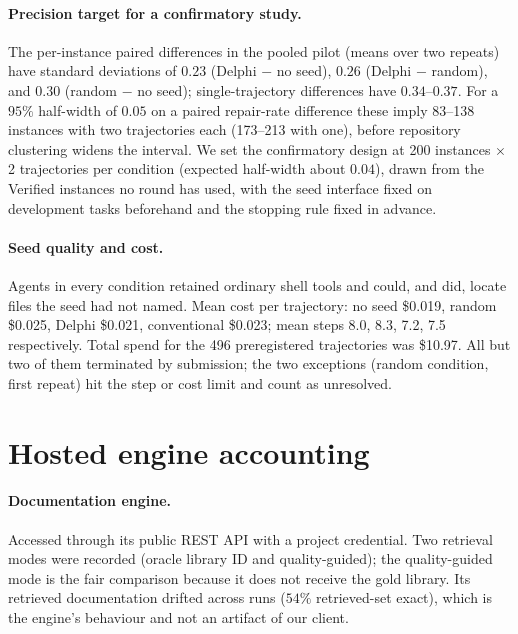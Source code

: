 \documentclass{article}
\newcommand{\system}{Delphi}
\begin{document}
\begin{table}[h]
\caption{Seed-interface check on the 62 pilot instances, one trajectory per instance (the no-seed and paths+heads rows are the first pilot repeat). Exploratory; not preregistered.}
\label{tab:seedinterface}
\centering
\footnotesize
\setlength{\tabcolsep}{4pt}
\resizebox{\textwidth}{!}{}
\end{table}

\paragraph{Precision target for a confirmatory study.} The per-instance paired differences in the pooled pilot (means over two repeats) have standard deviations of $0.23$ (\system{} $-$ no seed), $0.26$ (\system{} $-$ random), and $0.30$ (random $-$ no seed); single-trajectory differences have $0.34$--$0.37$. For a $95\%$ half-width of $0.05$ on a paired repair-rate difference these imply 83--138 instances with two trajectories each (173--213 with one), before repository clustering widens the interval. We set the confirmatory design at 200 instances $\times$ 2 trajectories per condition (expected half-width about $0.04$), drawn from the Verified instances no round has used, with the seed interface fixed on development tasks beforehand and the stopping rule fixed in advance.

\paragraph{Seed quality and cost.} Agents in every condition retained ordinary shell tools and could, and did, locate files the seed had not named. Mean cost per trajectory: no seed \$0.019, random \$0.025, \system{} \$0.021, conventional \$0.023; mean steps 8.0, 8.3, 7.2, 7.5 respectively. Total spend for the 496 preregistered trajectories was \$10.97. All but two of them terminated by submission; the two exceptions (random condition, first repeat) hit the step or cost limit and count as unresolved.

\section{Hosted engine accounting}
\label{app:hosted}

\paragraph{Documentation engine.} Accessed through its public REST API with a project credential. Two retrieval modes were recorded (oracle library ID and quality-guided); the quality-guided mode is the fair comparison because it does not receive the gold library. Its retrieved documentation drifted across runs ($54\%$ retrieved-set exact), which is the engine's behaviour and not an artifact of our client.
\end{document}
